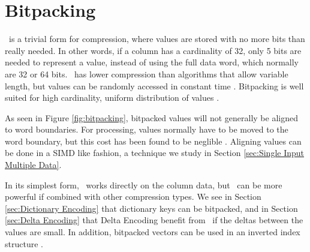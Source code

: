 \section{Bitpacking}
\label{sec:Bitpacking}

\bp~is a trivial form for compression, where values are stored with no more bits than really needed. In other words, if a column has a cardinality of 32, only 5 bits are needed to represent a value, instead of using the full data word, which normally are 32 or 64 bits. \bp~has lower compression than algorithms that allow variable length, but values can be randomly accessed in constant time \cite{Raman2008-gi, Willhalm2013-ri}. Bitpacking is well suited for high cardinality, uniform distribution of values \cite{Holloway2008-rr}. 

As seen in Figure \ref{fig:bitpacking}, bitpacked values will not generally be aligned to word boundaries. For processing, values normally have to be moved to the word boundary, but this cost has been found to be neglible \cite{Holloway2008-rr}. Aligning values can be done in a SIMD like fashion, a technique we study in Section \ref{sec:Single Input Multiple Data}.

In its simplest form, \bp~works directly on the column data, but \bp~can be more powerful if combined with other compression types. We see in Section \ref{sec:Dictionary Encoding} that dictionary keys can be bitpacked, and in Section \ref{sec:Delta Encoding} that Delta Encoding benefit from \bp~if the deltas between the values are small. In addition, bitpacked vectors can be used in an inverted index structure \cite{Schwalb2014-hn}.

